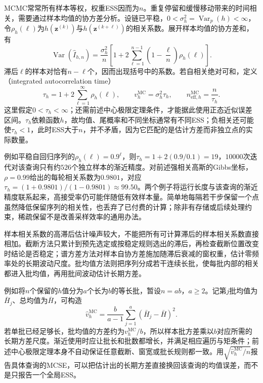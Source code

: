 MCMC常常所有样本等权，权重ESS因而为$n$。重复停留和缓慢移动带来的时间相关，需要通过样本均值的协方差分析。设链已平稳，$0<\sigma_h^2=\operatorname{Var}_p(h)<\infty$，令$\rho_h(\ell)$为$h(\bm{z}^{(k)})$与$h(\bm{z}^{(k+\ell)})$的相关系数。展开样本均值的协方差和，有
\begin{equation}
  \operatorname{Var}(\widehat I_{h,n})
    =\frac{\sigma_h^2}{n}
      \left[1+2\sum_{\ell=1}^{n-1}
          \left(1-\frac{\ell}{n}\right)\rho_h(\ell)\right].
  \label{eq:pgm-sampling-autocorrelation-variance}
\end{equation}
滞后$\ell$的样本对恰有$n-\ell$个，因而出现括号中的系数。若自相关绝对可和，定义（integrated autocorrelation time）
\begin{equation}
  \tau_h=1+2\sum_{\ell=1}^{\infty}\rho_h(\ell),\qquad
  v_h^{\mathrm{MC}}=\sigma_h^2\tau_h,\qquad
  n_{\mathrm{eff},h}^{\mathrm{MC}}=\frac{n}{\tau_h}.
  \label{eq:pgm-sampling-mcmc-ess}
\end{equation}
这里假定$0<\tau_h<\infty$；还需前述中心极限定理条件，才能据此使用正态近似误差区间。$\tau_h$依赖函数$h$，故均值、尾概率和不同坐标通常有不同ESS；负相关还可能使$\tau_h<1$，此时ESS大于$n$，并不矛盾，因为它匹配的是估计方差而非独立点的实际数量。

例如平稳自回归序列的$\rho_h(\ell)=0.9^\ell$，则$\tau_h=1+2(0.9/0.1)=19$，$10000$次迭代对该查询只有约$526$个独立样本的渐近精度。对前述强相关高斯的Gibbs坐标，$\rho=0.99$给出的每轮相关系数为$0.9801$，对应$\tau_h=(1+0.9801)/(1-0.9801)\approx99.50$。两个例子将运行长度与该查询的渐近精度联系起来，高接受率仍可能伴随低有效样本量。简单地每隔若干步保留一个点虽然降低保留序列的相关性，也丢弃了已付费的计算；除非有存储或后续处理约束，稀疏保留不是改善采样效率的通用办法。

样本相关系数的高滞后估计噪声较大，不能把所有可计算滞后的样本相关系数直接相加。截断方法只累计到预先选定或按稳定规则选出的滞后，再检查截断位置改变时结论是否稳定；谱方差方法对样本自协方差施加随滞后衰减的窗权重，估计零频率处的长期波动尺度。批均值方法则把序列分成若干连续长批，使每批内部的相关都进入批均值，再用批间波动估计长期方差。

例如将$n$个保留的$h$值分为$a$个长为$b$的等长批，暂设$n=ab$，$a\geq2$。记第$j$批均值为$\bar H_j$、总均值为$\bar H$，可构造
\[
  \widehat v_h^{\mathrm{MC}}
    =\frac{b}{a-1}\sum_{j=1}^a(\bar H_j-\bar H)^2.
\]
若单批已经足够长，批均值的方差约为$v_h^{\mathrm{MC}}/b$，所以样本批方差乘以$b$对应所需的长期方差尺度。渐近使用时应让批长和批数都增长，并满足相应遍历与矩条件；前述中心极限定理本身不自动保证任意截断、窗宽或批长规则都一致。用$\sqrt{\widehat v_h^{\mathrm{MC}}/n}$报告具体查询的MCSE，可以把估计出的长期方差直接换回该查询的均值误差，而不是只报告一个全局ESS。

